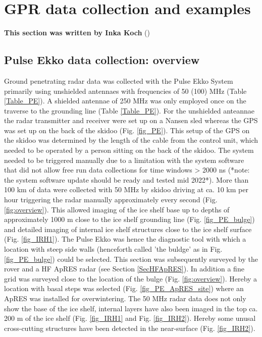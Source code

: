 \documentclass[a4paper,12pt]{article}
\begin{document}
\section{GPR data collection and examples}
\label{SecGpr}
\textbf{This section was written by Inka Koch}
(\href{mailto:inka.koch@uni-tuebingen.de}{\color{blue}{Email Me}})\\
\subsection{Pulse Ekko data collection: overview}
Ground penetrating radar data was collected with the Pulse Ekko System primarily using unshielded antennaes with frequencies of 50 (100) MHz (Table \ref{Table_PE}). A shielded antennae of 250 MHz was only employed once on the traverse to the grounding line (Table \ref{Table_PE}). For the unshielded anteannae the radar transmitter and receiver were set up on a Nansen sled whereas the GPS was set up on the back of the skidoo (Fig. \ref{fig_PE}). This setup of the GPS on the skidoo was determined by the length of the cable from the control unit, which needed to be operated by a person sitting on the back of the skidoo. The system needed to be triggered manually due to a limitation with the system software that did not allow free run data collections for time windows > 2000 ns (*note: the system software update should be ready and tested mid 2022*). More than 100 km of data were collected with 50 MHz by skidoo driving at ca. 10 km per hour triggering the radar manually approximately every second (Fig. \ref{fig:overview}). This allowed imaging of the ice shelf base up to depths of approximately 1000 m close to the ice shelf grounding line (Fig. \ref{fig_PE_bulge}) and detailed imaging of internal ice shelf structures close to the ice shelf surface (Fig. \ref{fig_IRH1}). The Pulse Ekko was hence the diagnostic tool with which a location with steep side walls (henceforth called 'the buldge' as in Fig. \ref{fig_PE_bulge}) could be selected. This section was subsequently surveyed by the rover and a HF ApRES radar (see Section \ref{SecHFApRES}). In addition a fine grid was surveyed close to the location of the bulge  (Fig. \ref{fig:overview}). Hereby a location with basal steps was selected (Fig. \ref{fig_PE_ApRES_site}) where an ApRES was installed for overwintering. The 50 MHz radar data does not only show the base of the ice shelf, internal layers have also been imaged in the top ca. 200 m of the ice shelf (Fig. \ref{fig_IRH1} and Fig. \ref{fig_IRH2}). Hereby some unusal cross-cutting structures have been detected in the near-surface (Fig. \ref{fig_IRH2}).  
\end{document}
